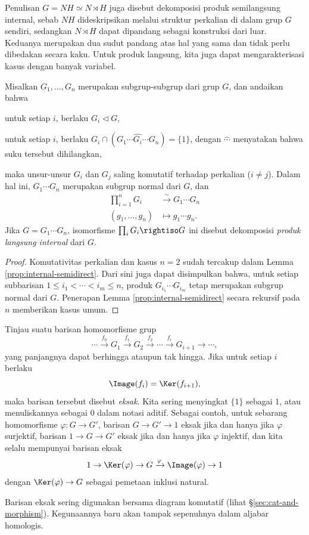 Penulisan $G = NH \simeq N \rtimes H$ juga disebut dekomposisi produk semilangsung internal, sebab $NH$ dideskripsikan melalui struktur perkalian di dalam grup $G$ sendiri, sedangkan $N \rtimes H$ dapat dipandang sebagai konstruksi dari luar. Keduanya merupakan dua sudut pandang atas hal yang sama dan tidak perlu dibedakan secara kaku. Untuk produk langsung, kita juga dapat mengarakterisasi kasus dengan banyak variabel.
\begin{lemma}\label{prop:internal-direct}
	Misalkan $G_1, \ldots, G_n$ merupakan subgrup-subgrup dari grup $G$, dan andaikan bahwa
	\begin{compactitem}
		\item untuk setiap $i$, berlaku $G_i \lhd G$,
		\item untuk setiap $i$, berlaku $G_i \cap (G_1 \cdots \widehat{G_i} \cdots G_n) = \{1\}$, dengan $\widehat{\cdots}$ menyatakan bahwa suku tersebut dihilangkan,
	\end{compactitem}
	maka unsur-unsur $G_i$ dan $G_j$ saling komutatif terhadap perkalian ($i \neq j$). Dalam hal ini, $G_1 \cdots G_n$ merupakan subgrup normal dari $G$, dan
	\begin{align*}
		\prod_{i=1}^n G_i & \stackrel{\sim}{\longrightarrow} G_1 \cdots G_n \\
		(g_1, \ldots, g_n) & \longmapsto g_1 \cdots g_n.
	\end{align*}
	 Jika $G = G_1 \cdots G_n$, isomorfisme $\prod_i G_i \rightiso G$ ini disebut dekomposisi \emph{produk langsung internal} dari $G$.
\end{lemma}
\begin{proof}
	Komutativitas perkalian dan kasus $n=2$ sudah tercakup dalam Lemma \ref{prop:internal-semidirect}. Dari sini juga dapat disimpulkan bahwa, untuk setiap subbarisan $1 \leq i_1 < \cdots < i_m \leq n$, produk $G_{i_1} \cdots G_{i_m}$ tetap merupakan subgrup normal dari $G$. Penerapan Lemma \ref{prop:internal-semidirect} secara rekursif pada $n$ memberikan kasus umum.
\end{proof}

\begin{definition} \label{def:exact-seq-group}
	Tinjau suatu barisan homomorfisme grup
	\[ \cdots \xrightarrow{f_0} G_1 \xrightarrow{f_1} G_2 \xrightarrow{f_2} \cdots \xrightarrow{f_i} G_{i+1} \to \cdots, \]
	yang panjangnya dapat berhingga ataupun tak hingga. Jika untuk setiap $i$ berlaku
	\[ \Image(f_i) = \Ker(f_{i+1}), \]
	maka barisan tersebut disebut \emph{eksak}. Kita sering menyingkat $\{1\}$ sebagai $1$, atau menuliskannya sebagai $0$ dalam notasi aditif. Sebagai contoh, untuk sebarang homomorfisme $\varphi: G \to G'$, barisan $G \to G' \to 1$ eksak jika dan hanya jika $\varphi$ surjektif, barisan $1 \to G \to G'$ eksak jika dan hanya jika $\varphi$ injektif, dan kita selalu mempunyai barisan eksak
	\[ 1 \to \Ker(\varphi) \to G \xrightarrow{\varphi} \Image(\varphi)  \to 1 \]
	dengan $\Ker(\varphi) \to G$ sebagai pemetaan inklusi natural.
\end{definition}
Barisan eksak sering digunakan bersama diagram komutatif (lihat \S\ref{sec:cat-and-morphism}). Kegunaannya baru akan tampak sepenuhnya dalam aljabar homologis.

